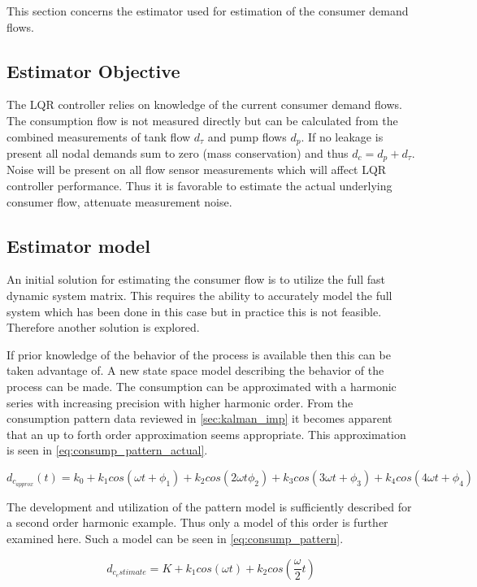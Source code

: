 This section concerns the estimator used for estimation of the consumer demand flows.

\subsection{Estimator Objective}
The LQR controller relies on knowledge of the current  consumer demand flows. The consumption flow is not measured directly but can be calculated from the combined measurements of tank flow $d_\tau$ and pump flows $d_p$. If no leakage is present all nodal demands sum to zero (mass conservation) and thus $d_c = d_p + d_\tau$. Noise will be present on all flow sensor measurements which will affect LQR controller performance. Thus it is favorable to estimate the actual underlying consumer flow, attenuate measurement noise.

\subsection{Estimator model}
An initial solution for estimating the consumer flow is to utilize the full fast dynamic system matrix. This requires the ability to accurately model the full system which has been done in this case but in practice this is not feasible. Therefore another solution is explored.

If prior knowledge of the behavior of the process is available then this can be taken advantage of. A new state space model describing the behavior of the process can be made. The consumption can be approximated with a harmonic series with increasing precision with higher harmonic order. From the consumption pattern data reviewed in \cref{sec:kalman_imp} it becomes apparent that an up to forth order approximation seems appropriate. This approximation is seen in \cref{eq:consump_pattern_actual}.

\begin{equation} \label{eq:consump_pattern_actual}
	d_{c_{approx}}(t) = k_0 + k_1 cos(\omega t + \phi_1) + k_2 cos(2\omega t \phi_2) + k_3 cos(3\omega t + \phi_3) + k_4 cos(4\omega t + \phi_4)
\end{equation}

The development and utilization of the pattern model is sufficiently described for a second order harmonic example. Thus only a model of this order is further examined here. Such a model can be seen in \cref{eq:consump_pattern}. 

\begin{equation} \label{eq:consump_pattern}
	d_{c_estimate} = K + k_1 cos(\omega t) + k_2 cos(\frac{\omega}{2} t)
\end{equation}



